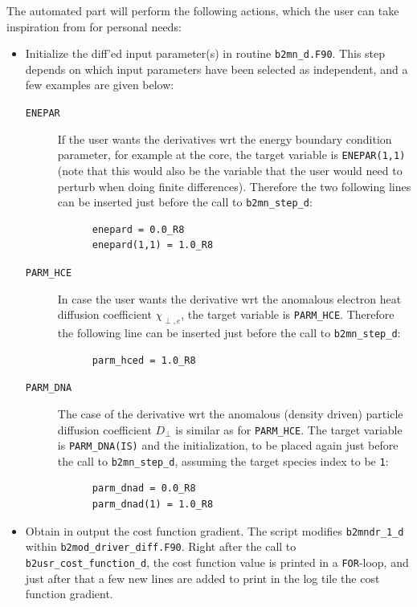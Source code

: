 The automated part will perform the following actions, which the user can take inspiration from for personal needs:
\begin{itemize}
  \item Initialize the diff'ed input parameter(s) in routine {\tt b2mn\_d.F90}. This step depends on which input parameters have been selected as independent, and a few examples are given below:
    \begin{description}
      \item[\tt ENEPAR] If the user wants the derivatives wrt the energy boundary condition parameter, for example at the core, the target variable is {\tt ENEPAR(1,1)} (note that this would also be the variable that the user would need to perturb when doing finite differences). Therefore the two following lines can be inserted just before the call to {\tt b2mn\_step\_d}:
\begin{verbatim}
      enepard = 0.0_R8
      enepard(1,1) = 1.0_R8
\end{verbatim}
      \item[\tt PARM\_HCE] In case the user wants the derivative wrt the anomalous electron heat diffusion coefficient $\chi_{\perp,e}$, the target variable is {\tt PARM\_HCE}. Therefore the following line can be inserted just before the call to {\tt b2mn\_step\_d}:
\begin{verbatim}
      parm_hced = 1.0_R8
\end{verbatim}
      \item[\tt PARM\_DNA] The case of the derivative wrt the anomalous (density driven) particle diffusion coefficient $D_{\perp}$ is similar as for {\tt PARM\_HCE}. The target variable is {\tt PARM\_DNA(IS)} and the initialization, to be placed again just before the call to {\tt b2mn\_step\_d}, assuming the target species index to be {\tt 1}:
\begin{verbatim}
      parm_dnad = 0.0_R8
      parm_dnad(1) = 1.0_R8
\end{verbatim}
    \end{description}

  \item Obtain in output the cost function gradient. The script modifies {\tt b2mndr\_1\_d} within {\tt b2mod\_driver\_diff.F90}. Right after the call to {\tt b2usr\_cost\_function\_d}, the cost function value is printed in a {\tt FOR}-loop, and just after that a few new lines are added to print in the log tile the cost function gradient.
\end{itemize}

